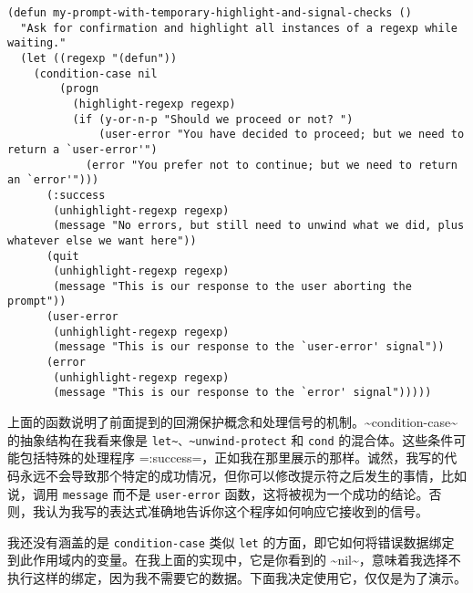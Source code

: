 \documentclass[11pt]{ctexart}
\begin{document}
\begin{verbatim}
(defun my-prompt-with-temporary-highlight-and-signal-checks ()
  "Ask for confirmation and highlight all instances of a regexp while waiting."
  (let ((regexp "(defun"))
    (condition-case nil
        (progn
          (highlight-regexp regexp)
          (if (y-or-n-p "Should we proceed or not? ")
              (user-error "You have decided to proceed; but we need to return a `user-error'")
            (error "You prefer not to continue; but we need to return an `error'")))
      (:success
       (unhighlight-regexp regexp)
       (message "No errors, but still need to unwind what we did, plus whatever else we want here"))
      (quit
       (unhighlight-regexp regexp)
       (message "This is our response to the user aborting the prompt"))
      (user-error
       (unhighlight-regexp regexp)
       (message "This is our response to the `user-error' signal"))
      (error
       (unhighlight-regexp regexp)
       (message "This is our response to the `error' signal")))))
\end{verbatim}

上面的函数说明了前面提到的回溯保护概念和处理信号的机制。\textasciitilde{}condition-case\textasciitilde{} 的抽象结构在我看来像是 \texttt{let\textasciitilde{}、\textasciitilde{}unwind-protect} 和 \texttt{cond} 的混合体。这些条件可能包括特殊的处理程序 =:success=，正如我在那里展示的那样。诚然，我写的代码永远不会导致那个特定的成功情况，但你可以修改提示符之后发生的事情，比如说，调用 \texttt{message} 而不是 \texttt{user-error} 函数，这将被视为一个成功的结论。否则，我认为我写的表达式准确地告诉你这个程序如何响应它接收到的信号。

我还没有涵盖的是 \texttt{condition-case} 类似 \texttt{let} 的方面，即它如何将错误数据绑定到此作用域内的变量。在我上面的实现中，它是你看到的 \textasciitilde{}nil\textasciitilde{}，意味着我选择不执行这样的绑定，因为我不需要它的数据。下面我决定使用它，仅仅是为了演示。
\end{document}
